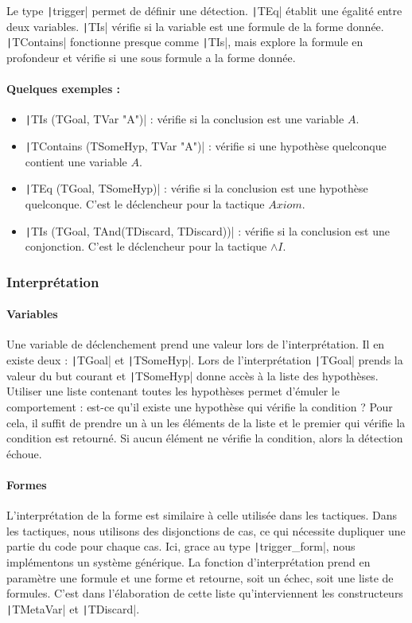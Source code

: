 \documentclass[titlepage]{article}
\begin{document}
Le type \texttt|trigger| permet de définir une détection. \texttt|TEq| établit une égalité entre deux variables. \texttt|TIs| vérifie si la variable est une formule de la forme donnée. \texttt|TContains| fonctionne presque comme \texttt|TIs|, mais explore la formule en profondeur et vérifie si une sous formule a la forme donnée.

\paragraph{Quelques exemples :}
\begin{itemize}
    \item \texttt|TIs (TGoal, TVar "A")| : vérifie si la conclusion est une variable $A$.
    \item \texttt|TContains (TSomeHyp, TVar "A")| : vérifie si une hypothèse quelconque contient une variable $A$.
    \item \texttt|TEq (TGoal, TSomeHyp)| : vérifie si la conclusion est une hypothèse quelconque. C'est le déclencheur pour la tactique $Axiom$.
    \item \texttt|TIs (TGoal, TAnd(TDiscard, TDiscard))| : vérifie si la conclusion est une conjonction. C'est le déclencheur pour la tactique $\land I$.
\end{itemize}

\subsubsection{Interprétation}

\paragraph{Variables}
Une variable de déclenchement prend une valeur lors de l'interprétation. Il en existe deux : \texttt|TGoal| et \texttt|TSomeHyp|. Lors de l'interprétation \texttt|TGoal| prends la valeur du but courant et \texttt|TSomeHyp| donne accès à la liste des hypothèses. Utiliser une liste contenant toutes les hypothèses permet d'émuler le comportement : est-ce qu'il existe une hypothèse qui vérifie la condition ? Pour cela, il suffit de prendre un à un les éléments de la liste et le premier qui vérifie la condition est retourné. Si aucun élément ne vérifie la condition, alors la détection échoue.

\paragraph{Formes}
L'interprétation de la forme est similaire à celle utilisée dans les tactiques. Dans les tactiques, nous utilisons des disjonctions de cas, ce qui nécessite dupliquer une partie du code pour chaque cas. Ici, grace au type \texttt|trigger_form|, nous implémentons un système générique. La fonction d'interprétation prend en paramètre une formule et une forme et retourne, soit un échec, soit une liste de formules. C'est dans l'élaboration de cette liste qu'interviennent les constructeurs \texttt|TMetaVar| et \texttt|TDiscard|.
\end{document}
